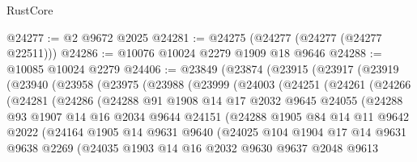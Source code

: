 \begin{lexlean}{RustCore}
\begin{coremodule}
@24277 := @2 @9672 @2025
@24281 := @24275 (@24277 (@24277 (@24277 @22511)))
@24286 := @10076 @10024 @2279 @1909 @18 @9646
@24288 := @10085 @10024 @2279
@24406 := @23849
    (@23874
      (@23915
        (@23917
          (@23919
            (@23940
              (@23958
                (@23975
                  (@23988
                    (@23999
                      (@24003
                        (@24251
                          (@24261
                            (@24266
                              (@24281
                                (@24286
                                  (@24288
                                    @91
                                    @1908
                                    @14
                                    @17
                                    @2032
                                    @9645
                                    @24055
                                    (@24288
                                      @93
                                      @1907
                                      @14
                                      @16
                                      @2034
                                      @9644
                                      @24151
                                      (@24288
                                        @1905
                                        @84
                                        @14
                                        @11
                                        @9642
                                        @2022
                                        (@24164
                                          @1905
                                          @14
                                          @9631
                                          @9640
                                          (@24025
                                            @104
                                            @1904
                                            @17
                                            @14
                                            @9631
                                            @9638
                                            @2269
                                            (@24035
                                              @1903
                                              @14
                                              @16
                                              @2032
                                              @9630
                                              @9637
                                              @2048
                                              @9613

\end{coremodule}
\end{lexlean}
